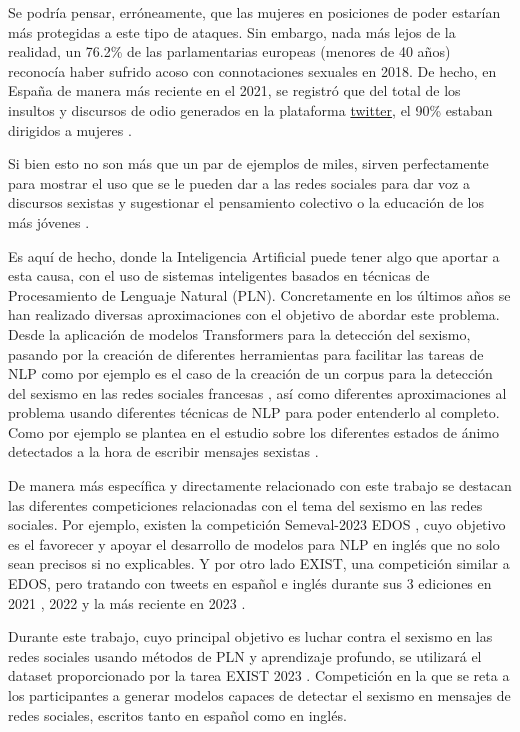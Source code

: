 Se podría pensar, erróneamente, que las mujeres en posiciones de poder estarían más protegidas a este tipo de ataques. Sin embargo, nada más lejos de la realidad, un 76.2\% de las parlamentarias europeas (menores de 40 años) reconocía haber sufrido acoso con connotaciones sexuales en 2018\cite{union2018sexism}. De hecho, en España de manera más reciente en el 2021, se registró que del total de los insultos y discursos de odio generados en la plataforma \href{https://twitter.com}{twitter}, el 90\% estaban dirigidos a mujeres \cite{pineiro2021say}.\newline 

Si bien esto no son más que un par de ejemplos de miles, sirven perfectamente para mostrar el uso que se le pueden dar a las redes sociales para dar voz a discursos sexistas y sugestionar el pensamiento colectivo o la educación de los más jóvenes \cite{prieto2013importancia}.

Es aquí de hecho, donde la Inteligencia Artificial puede tener algo que aportar a esta causa, con el uso de sistemas inteligentes basados en técnicas de Procesamiento de Lenguaje Natural (PLN). Concretamente en los últimos años se han realizado diversas aproximaciones con el objetivo de abordar este problema. Desde la aplicación de modelos Transformers \cite{schutz2021automatic} para la detección del sexismo, pasando por la creación de diferentes herramientas para facilitar las tareas de NLP como por ejemplo es el caso de la creación de un corpus para la detección del sexismo en las redes sociales francesas \cite{chiril2020annotated}, así como diferentes aproximaciones al problema usando diferentes técnicas de NLP para poder entenderlo al completo. Como por ejemplo se plantea en el estudio sobre los diferentes estados de ánimo detectados a la hora de escribir mensajes sexistas \cite{sharifirad2019your}.

De manera más específica y directamente relacionado con este trabajo se destacan las diferentes competiciones relacionadas con el tema del sexismo en las redes sociales. Por ejemplo, existen la competición Semeval-2023 EDOS \cite{kirk2023semeval}, cuyo objetivo es el favorecer y apoyar el desarrollo de modelos para NLP en inglés que no solo sean precisos si no explicables. Y por otro lado EXIST, una competición similar a EDOS, pero tratando con tweets en español e inglés durante sus 3 ediciones en 2021 \cite{rodriguez2021overview}, 2022 \cite{rodriguez2022overview} y la más reciente en 2023 \cite{spina2023exist}.

Durante este trabajo, cuyo principal objetivo es luchar contra el sexismo en las redes sociales usando métodos de PLN y aprendizaje profundo, se utilizará el dataset proporcionado por la tarea EXIST 2023 . Competición en la que se reta a los participantes a generar modelos capaces de detectar el sexismo en mensajes de redes sociales, escritos tanto en español como en inglés. 

